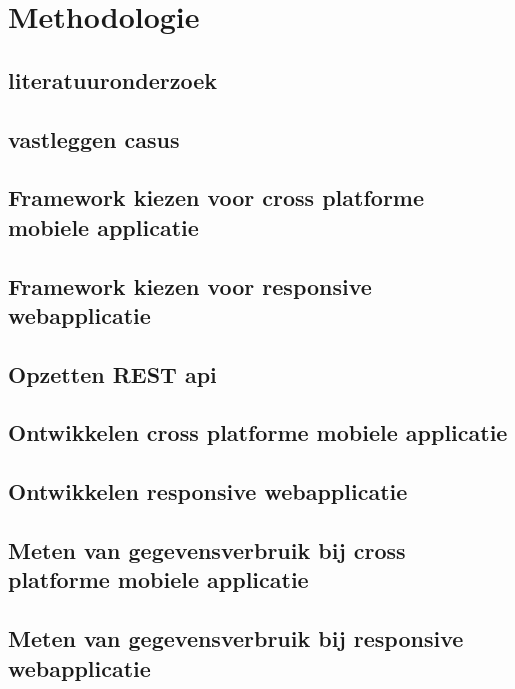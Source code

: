
\chapter{Methodologie}
\label{ch:methodologie}


\section{literatuuronderzoek}
\section{vastleggen casus}
\section{Framework kiezen voor cross platforme mobiele applicatie}
\section{Framework kiezen voor responsive webapplicatie}
\section{Opzetten REST api}
\section{Ontwikkelen cross platforme mobiele applicatie}
\section{Ontwikkelen responsive webapplicatie}
\section{Meten van gegevensverbruik bij cross platforme mobiele applicatie}
\section{Meten van gegevensverbruik bij responsive webapplicatie}
\lipsum[21-25]
